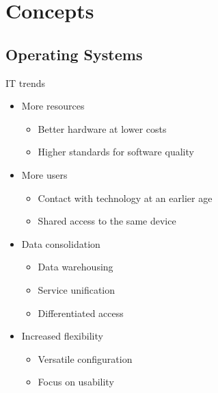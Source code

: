 \section{Concepts}

\subsection{Operating Systems}

\begin{frame}{IT trends}
	\begin{itemize}
		\item More resources
			\begin{itemize}
			\item Better hardware at lower costs
			\item Higher standards for software quality
			\end{itemize}
		\item More users
			\begin{itemize}
			\item Contact with technology at an earlier age
			\item Shared access to the same device
			\end{itemize}
		\item Data consolidation
			\begin{itemize}
			\item Data warehousing
			\item Service unification
			\item Differentiated access
			\end{itemize}
		\item Increased flexibility
			\begin{itemize}
			\item Versatile configuration
			\item Focus on usability
		\end{itemize}
	\end{itemize}
\end{frame}

